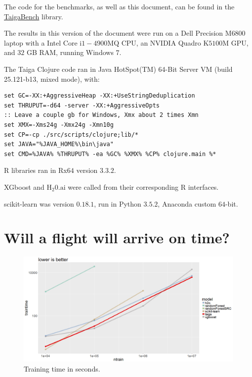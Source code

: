 \documentclass[10pt]{article}
\begin{document}
The code for the benchmarks, as well as this document, can be found in the
\href{https://github.com/wahpenayo/taigabench/tree/master}{TaigaBench}
 library.

The results in this version of the document were run on a
Dell Precision $\mathrm{M}6800$ laptop with a Intel Core
$\mathrm{i}1-4900\mathrm{MQ}$ CPU, an NVIDIA Quadro
$\mathrm{K}5100\mathrm{M}$ GPU, and $32$ GB RAM,
running Windows $7$.

The Taiga Clojure code ran in Java HotSpot(TM) 64-Bit Server VM (build
25.121-b13, mixed mode), with:
\begin{verbatim}
set GC=-XX:+AggressiveHeap -XX:+UseStringDeduplication 
set THRUPUT=-d64 -server -XX:+AggressiveOpts 
:: Leave a couple gb for Windows, Xmx about 2 times Xmn
set XMX=-Xms24g -Xmx24g -Xmn10g 
set CP=-cp ./src/scripts/clojure;lib/*
set JAVA="%JAVA_HOME%\bin\java"
set CMD=%JAVA% %THRUPUT% -ea %GC% %XMX% %CP% clojure.main %*
\end{verbatim}

R libraries ran in Rx$64$ version $3.3.2$. 

XGboost and $\mathrm{H_{2}0.ai}$ were called from their corresponding R
interfaces.

scikit-learn was version $0.18.1$, run in Python $3.5.2$, Anaconda
custom $64$-bit.

\section{\label{sec:ontime}Will a flight will arrive on time?}

\begin{figure}[H]
\noindent \begin{centering}
\includegraphics[width=14cm]{ontime/traintime.png}
\par\end{centering}
\protect\caption{\label{fig:ontime-traintime}Training time in seconds.}
\end{figure}
\end{document}

